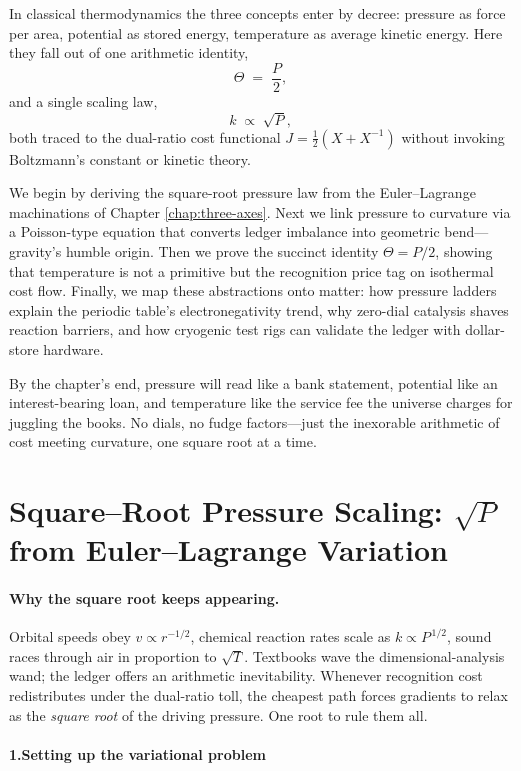 \documentclass[11pt,oneside]{book}
\begin{document}
In classical thermodynamics the three concepts enter by decree: pressure
as force per area, potential as stored energy, temperature as
average kinetic energy.  
Here they fall out of one arithmetic identity,
\[
  \Theta \;=\; \frac{P}{2},
\]
and a single scaling law,
\[
  k \;\propto\; \sqrt{P},
\]
both traced to the dual-ratio cost functional
\(J=\tfrac12(X+X^{-1})\) without invoking Boltzmann’s constant or
kinetic theory.  

We begin by deriving the square-root pressure law from the
Euler–Lagrange machinations of Chapter \ref{chap:three-axes}.  
Next we link pressure to curvature via a Poisson-type equation that
converts ledger imbalance into geometric bend—gravity’s humble origin.
Then we prove the succinct identity \(\Theta=P/2\), showing that
temperature is not a primitive but the recognition price tag on
isothermal cost flow.  
Finally, we map these abstractions onto matter: how pressure ladders
explain the periodic table’s electronegativity trend, why zero-dial
catalysis shaves reaction barriers, and how cryogenic test rigs can
validate the ledger with dollar-store hardware.

By the chapter’s end, pressure will read like a bank statement, potential
like an interest-bearing loan, and temperature like the service fee the
universe charges for juggling the books.  
No dials, no fudge factors—just the inexorable arithmetic of cost
meeting curvature, one square root at a time.

\section{Square–Root Pressure Scaling: \texorpdfstring{$\sqrt{P}$}{√P} from Euler–Lagrange Variation}
\label{sec:sqrtP-scaling}

\paragraph*{Why the square root keeps appearing.}
Orbital speeds obey $v\propto r^{-1/2}$, chemical reaction rates scale as $k\propto P^{\,1/2}$, sound races through air in proportion to $\sqrt{T}$.  
Textbooks wave the dimensional-analysis wand; the ledger offers an arithmetic inevitability.  
Whenever recognition cost redistributes under the dual-ratio toll, the cheapest path forces gradients to relax as the \emph{square root} of the driving pressure.  
One root to rule them all.

\paragraph*{1.\;Setting up the variational problem}
\end{document}
